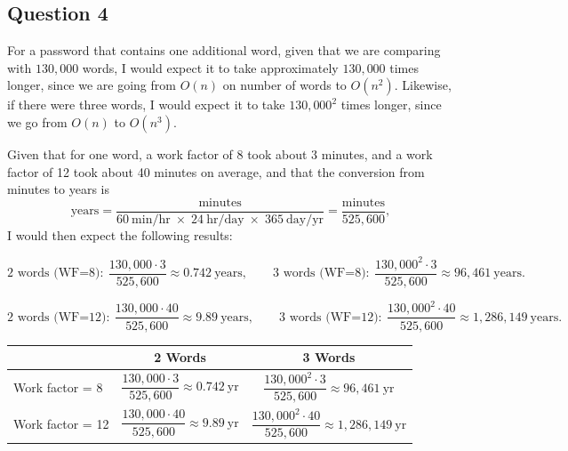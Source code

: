 \documentclass[11pt]{article}
\begin{document}
\subsection*{Question 4}

For a password that contains one additional word, given that we are comparing with
\(130{,}000\) words, I would expect it to take approximately \(130{,}000\) times longer,
since we are going from \(O(n)\) on number of words to \(O(n^{2})\).
Likewise, if there were three words, I would expect it to take \(130{,}000^{2}\) times
longer, since we go from \(O(n)\) to \(O(n^{3})\).

Given that for one word, a work factor of 8 took about 3 minutes, and a work factor of 12
took about 40 minutes on average, and that the conversion from minutes to years is
\[
\text{years}=\frac{\text{minutes}}{60\ \text{min/hr}\;\times\;24\ \text{hr/day}\;\times\;365\ \text{day/yr}}
=\frac{\text{minutes}}{525{,}600},
\]
I would then expect the following results:

\[
\text{2 words (WF=8)}:\ \frac{130{,}000 \cdot 3}{525{,}600} \approx 0.742\ \text{years},\qquad
\text{3 words (WF=8)}:\ \frac{130{,}000^{2} \cdot 3}{525{,}600} \approx 96{,}461\ \text{years}.
\]

\[
\text{2 words (WF=12)}:\ \frac{130{,}000 \cdot 40}{525{,}600} \approx 9.89\ \text{years},\qquad
\text{3 words (WF=12)}:\ \frac{130{,}000^{2} \cdot 40}{525{,}600} \approx 1{,}286{,}149\ \text{years}.
\]

\bigskip

\begin{tabular}{l|c|c}
\hline
 & 2 Words & 3 Words \\
\hline
Work factor = 8  & \( \dfrac{130{,}000 \cdot 3}{525{,}600} \approx 0.742\ \text{yr} \)
                 & \( \dfrac{130{,}000^{2} \cdot 3}{525{,}600} \approx 96{,}461\ \text{yr} \) \\
\hline
Work factor = 12 & \( \dfrac{130{,}000 \cdot 40}{525{,}600} \approx 9.89\ \text{yr} \)
                 & \( \dfrac{130{,}000^{2} \cdot 40}{525{,}600} \approx 1{,}286{,}149\ \text{yr} \) \\
\hline
\end{tabular}
\end{document}
